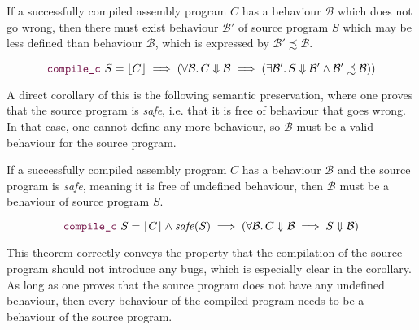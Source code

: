 \begin{theorem}\label{thm:semantic-preservation}
  If a successfully compiled assembly program $C$ has a behaviour $\mathcal{B}$ which does
  not go wrong, then there must exist behaviour $\mathcal{B}'$ of source program $S$ which
  may be less defined than behaviour $\mathcal{B}$, which is expressed by $\mathcal{B}' \precsim \mathcal{B}$.

  {\normalfont\begin{equation}
      \yhfunction{compile\_c}\ S = \ccok{C}
      \implies (\forall \mathcal{B}\ldotp C \Downarrow \mathcal{B} \implies (\exists \mathcal{B}'\ldotp S
      \Downarrow \mathcal{B}' \land \mathcal{B}' \precsim \mathcal{B}))
  \end{equation}}
\end{theorem}

A direct corollary of this is the following semantic preservation, where one
proves that the source program is \emph{safe}, i.e. that it is free of behaviour
that goes wrong.  In that case, one cannot define any more behaviour, so $\mathcal{B}$
must be a valid behaviour for the source program.

\begin{corollary}
  If a successfully compiled assembly program $C$ has a behaviour $\mathcal{B}$ and the
  source program is \emph{safe}, meaning it is free of undefined behaviour, then
  $\mathcal{B}$ must be a behaviour of source program $S$.

  {\normalfont\begin{equation} \yhfunction{compile\_c}\ S = \ccok{C}
      \land \mathit{safe}(S) \implies (\forall \mathcal{B}\ldotp C \Downarrow \mathcal{B} \implies S
      \Downarrow \mathcal{B})
  \end{equation}}
\end{corollary}

This theorem correctly conveys the property that the compilation of the source
program should not introduce any bugs, which is especially clear in the
corollary.  As long as one proves that the source program does not have any
undefined behaviour, then every behaviour of the compiled program needs to be a
behaviour of the source program.

